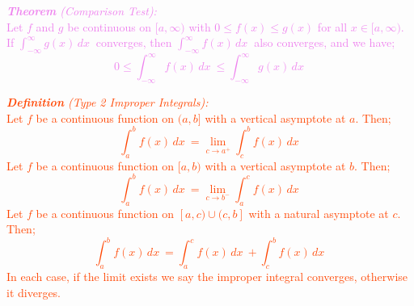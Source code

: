 \documentclass{report}
\newenvironment{definition}[1][OrangeRed]
  {\begin{tcolorbox}[colframe=#1,colback=white]}
  {\end{tcolorbox}}
\newenvironment{theorem}[1][Violet]
  {\begin{tcolorbox}[colframe=#1,colback=white]}
  {\end{tcolorbox}}
\begin{document}
\begin{theorem}
    \textcolor{Violet}{\textit{\textbf{Theorem} (Comparison Test):}\\
    Let $f$ and $g$ be continuous on $[a,\infty)$ with $0 \leq f(x) \leq g(x)$ for all $x \in [a,\infty)$. If $\int_{-\infty}^\infty g(x) \,dx\ $ converges, then $\int_{-\infty}^\infty f(x) \,dx\ $ also converges, and we have;
    \begin{equation}
        0 \leq \int_{-\infty}^\infty f(x) \,dx\ \leq \int_{-\infty}^\infty g(x) \,dx\
    \end{equation}}
\end{theorem}

\begin{definition}
    \textcolor{OrangeRed}{\textit{\textbf{Definition} (Type 2 Improper Integrals):}\\
    Let $f$ be a continuous function on $(a,b]$ with a vertical asymptote at $a$. Then;
    \begin{equation}
        \int_a^b f(x) \,dx\ = \lim_{c \longrightarrow a^+} \int_c^b f(x) \,dx\
    \end{equation}
    Let $f$ be a continuous function on $[a,b)$ with a vertical asymptote at $b$. Then;
    \begin{equation}
        \int_a^b f(x) \,dx\ = \lim_{c \longrightarrow b^-} \int_a^c f(x) \,dx\
    \end{equation}
    Let $f$ be a continuous function on $[a,c) \cup (c,b]$ with a natural asymptote at $c$. Then;
    \begin{equation}
        \int_a^b f(x) \,dx\ = \int_a^c f(x) \,dx\ + \int_c^b f(x) \,dx\
    \end{equation}
    In each case, if the limit exists we say the improper integral converges, otherwise it diverges.}
\end{definition}
\end{document}
